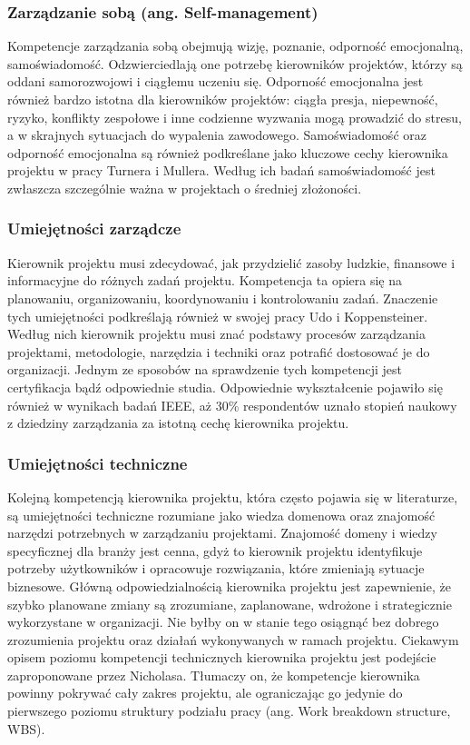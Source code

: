 \subsubsection{Zarządzanie sobą (ang. Self-management)}
Kompetencje zarządzania sobą obejmują wizję, poznanie, odporność emocjonalną, samoświadomość. Odzwierciedlają one potrzebę kierowników projektów, którzy są oddani samorozwojowi i ciągłemu uczeniu się. Odporność emocjonalna jest również bardzo istotna dla kierowników projektów: ciągła presja, niepewność, ryzyko, konflikty zespołowe i inne codzienne wyzwania mogą prowadzić do stresu, a w skrajnych sytuacjach do wypalenia zawodowego.\autocite{Alvarenga} Samoświadomość oraz odporność emocjonalna są również podkreślane jako kluczowe cechy kierownika projektu w pracy Turnera i Mullera. Według ich badań samoświadomość jest zwłaszcza szczególnie ważna w projektach o średniej złożoności.\autocite{turnermuller2010}

\subsubsection{Umiejętności zarządcze}
Kierownik projektu musi zdecydować, jak przydzielić zasoby ludzkie, finansowe i informacyjne do różnych zadań projektu. Kompetencja ta opiera się na planowaniu, organizowaniu, koordynowaniu i kontrolowaniu zadań.\autocite{Gottschalk} Znaczenie tych umiejętności podkreślają również w swojej pracy Udo i Koppensteiner. Według nich kierownik projektu musi znać podstawy procesów zarządzania projektami, metodologie, narzędzia i techniki oraz potrafić dostosować je do organizacji.
Jednym ze sposobów na sprawdzenie tych kompetencji jest certyfikacja bądź odpowiednie studia.\autocite{Koppensteiner} Odpowiednie wykształcenie pojawiło się również w wynikach badań IEEE, aż 30\% respondentów uznało stopień naukowy z dziedziny zarządzania za istotną cechę kierownika projektu.\autocite{analizaMulti}

\subsubsection{Umiejętności techniczne}
Kolejną kompetencją kierownika projektu, która często pojawia się w literaturze, są umiejętności techniczne rozumiane jako wiedza domenowa oraz znajomość narzędzi potrzebnych w zarządzaniu projektami. \autocite{arras2010} \autocite{brill}
Znajomość domeny i wiedzy specyficznej dla branży jest cenna, gdyż to kierownik projektu identyfikuje potrzeby użytkowników i opracowuje rozwiązania, które zmieniają sytuacje biznesowe. Główną odpowiedzialnością kierownika projektu jest zapewnienie, że szybko planowane zmiany są zrozumiane, zaplanowane, wdrożone i strategicznie wykorzystane w organizacji.\autocite{Gottschalk} Nie byłby on w stanie tego osiągnąć bez dobrego zrozumienia projektu oraz działań wykonywanych w ramach projektu.
Ciekawym opisem poziomu kompetencji technicznych kierownika projektu jest podejście zaproponowane przez Nicholasa. Tłumaczy on, że kompetencje kierownika powinny pokrywać cały zakres projektu, ale ograniczając go jedynie do pierwszego poziomu struktury podziału pracy (ang. Work breakdown structure, WBS).\autocite{NicholasSteyn}

